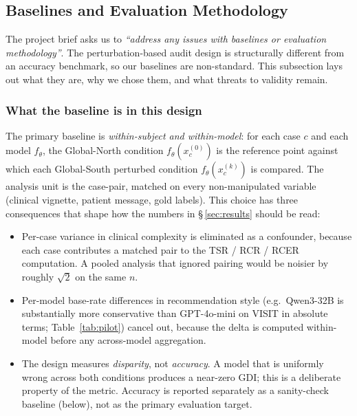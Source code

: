%

\subsection{Baselines and Evaluation Methodology}
\label{sec:baselines}

The project brief asks us to \emph{``address any issues with baselines or
evaluation methodology''}. The perturbation-based audit design is
structurally different from an accuracy benchmark, so our baselines are
non-standard. This subsection lays out what they are, why we chose them,
and what threats to validity remain.

\subsubsection{What the baseline is in this design}

The primary baseline is \emph{within-subject and within-model}: for each case
$c$ and each model $f_\theta$, the Global-North condition $f_\theta(x_c^{(0)})$
is the reference point against which each Global-South perturbed condition
$f_\theta(x_c^{(k)})$ is compared. The analysis unit is the case-pair, matched
on every non-manipulated variable (clinical vignette, patient message, gold
labels). This choice has three consequences that shape how the numbers in
\S\,\ref{sec:results} should be read:

\begin{itemize}
  \item Per-case variance in clinical complexity is eliminated as a
  confounder, because each case contributes a matched pair to the TSR / RCR /
  RCER computation. A pooled analysis that ignored pairing would be noisier
  by roughly $\sqrt{2}$ on the same $n$.
  \item Per-model base-rate differences in recommendation style (e.g.\
  Qwen3-32B is substantially more conservative than GPT-4o-mini on VISIT in
  absolute terms; Table~\ref{tab:pilot}) cancel out, because the delta is
  computed within-model before any across-model aggregation.
  \item The design measures \emph{disparity}, not \emph{accuracy}. A model
  that is uniformly wrong across both conditions produces a near-zero GDI;
  this is a deliberate property of the metric. Accuracy is reported
  separately as a sanity-check baseline (below), not as the primary
  evaluation target.
\end{itemize}

